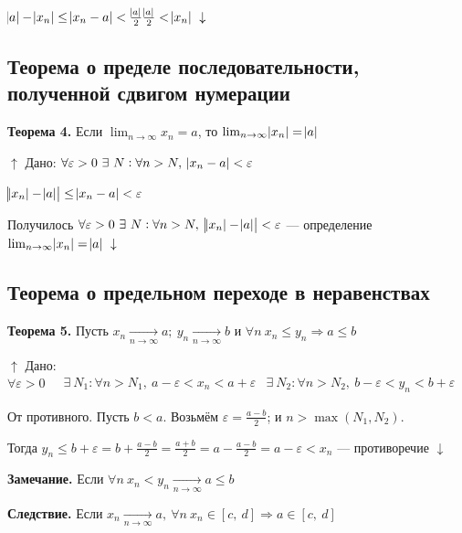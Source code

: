 \documentclass{article}
\begin{document}
    \(\abs{a} - \abs{x_n} \leq \abs{x_n - a} < \frac{\abs{a}}{2}\\ \frac{\abs{a}}{2} < \abs{x_n}\ \downarrow\)
    
    \subsection{Теорема о пределе последовательности, полученной сдвигом нумерации}
    
    \textbf{Теорема 4.} Если \(\lim_{n \rightarrow \infty}{x_n} = a\), то \(\lim_{n \rightarrow \infty}{\abs{x_n}} = \abs{a}\)
    
    \(\uparrow\) Дано: \(\forall \varepsilon > 0\ \exists\ N : \forall n > N,\ \abs{x_n - a} < \varepsilon\)
    
    \(\abs{\abs{x_n} - \abs{a}} \leq \abs{x_n - a} < \varepsilon\)
    
    Получилось \(\forall \varepsilon > 0\ \exists\ N : \forall n > N,\ \abs{\abs{x_n} - \abs{a}} < \varepsilon\) --- определение \(\lim_{n \rightarrow \infty}{\abs{x_n}} = \abs{a}\ \downarrow\)
    
    \subsection{Теорема о предельном переходе в неравенствах}
    
    \textbf{Теорема 5.} Пусть \(x_n \xrightarrow[n \rightarrow \infty]{} a;\ y_n \xrightarrow[n \rightarrow \infty]{} b\) и \(\forall n\ x_n \leq y_n \Rightarrow a \leq b\)
    
    \(\uparrow\) Дано: \(\forall \varepsilon > 0\ \begin{aligned}
    	&\exists\ N_1 : \forall n > N_1,\ a - \varepsilon < x_n < a + \varepsilon
        &\exists\ N_2 : \forall n > N_2,\ b - \varepsilon < y_n < b + \varepsilon
        \end{aligned}\)
    
    От противного. Пусть \(b < a\). Возьмём \(\varepsilon = \frac{a-b}{2}\); и \(n > \max{(N_1, N_2)}\).
    
    Тогда \(y_n \leq b + \varepsilon = b + \frac{a-b}{2} = \frac{a + b}{2} = a - \frac{a-b}{2} = a - \varepsilon < x_n\) --- противоречие \(\downarrow\)
    
    \textbf{Замечание.} Если \(\forall n\ x_n < y_n \xrightarrow[n \rightarrow \infty]{} a \leq b\)
  
    \textbf{Следствие.} Если \(x_n \xrightarrow[n \rightarrow \infty]{} a,\ \forall n\ x_n \in [c,\ d] \Rightarrow a \in [c,\ d]\)
    
\end{document}
